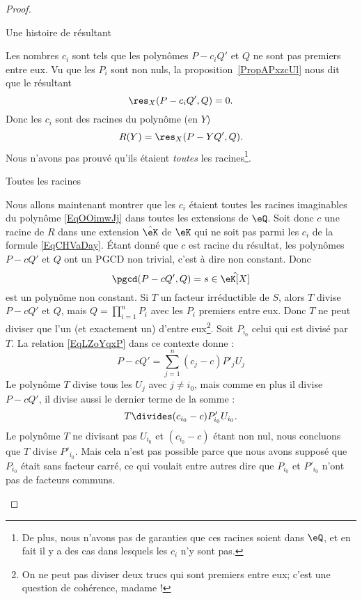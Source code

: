 \begin{proof}
\begin{subproof}
\item[Une histoire de résultant]

    Les nombres \( c_i\) sont tels que les polynômes \( P-c_iQ'\) et \( Q\) ne sont pas premiers entre eux. Vu que les \( P_i\) sont non nuls, la proposition~\ref{PropAPxzcUl} nous dit que le résultant
    \begin{equation}
        \res_X(P-c_iQ',Q)=0.
    \end{equation}
    Donc les \( c_i\) sont des racines du polynôme (en \( Y\))
    \begin{equation}    \label{EqOOimwJj}
        R(Y)=\res_X(P-YQ',Q).
    \end{equation}
    Nous n'avons pas prouvé qu'ils étaient \emph{toutes} les racines\footnote{De plus, nous n'avons pas de garanties que ces racines soient dans \( \eQ\), et en fait il y a des cas dans lesquels les \( c_i\) n'y sont pas.}.

\item[Toutes les racines]

    Nous allons maintenant montrer que les \( c_i\) étaient toutes les racines imaginables du polynôme \eqref{EqOOimwJj} dans toutes les extensions de \( \eQ\). Soit donc \( c\) une racine de \( R\) dans une extension \( \hat \eK\) de \( \eK\) qui ne soit pas parmi les \( c_i\) de la formule \eqref{EqCHVaDay}. Étant donné que \( c\) est racine du résultat, les polynômes \( P-cQ'\) et \( Q\) ont un PGCD non trivial, c'est à dire non constant. Donc
    \begin{equation}
        \pgcd(P-cQ',Q)=s\in \hat\eK[X]
    \end{equation}
    est un polynôme non constant. Si \( T\) un facteur irréductible de \( S\), alors \( T\) divise \( P-cQ'\) et \( Q\), mais \( Q=\prod_{i=1}^nP_i\) avec les \( P_i\) premiers entre eux. Donc \( T\) ne peut diviser que l'un (et exactement un) d'entre eux\footnote{On ne peut pas diviser deux trucs qui sont premiers entre eux; c'est une question de cohérence, madame !}. Soit \( P_{i_0}\) celui qui est divisé par \( T\). La relation \eqref{EqLZoYqxP} dans ce contexte donne :
    \begin{equation}
        P-cQ'=\sum_{j=1}^n(c_j-c)P'_jU_j
    \end{equation}
    Le polynôme \( T\) divise tous les \( U_j\) avec \( j\neq i_0\), mais comme en plus il divise \( P-cQ'\), il divise aussi le dernier terme de la somme :
    \begin{equation}
        T\divides (c_{i_0}-c)P'_{i_0}U_{i_0}.
    \end{equation}
    Le polynôme \( T\) ne divisant pas \( U_{i_0}\) et \(  (c_{i_0}-c)  \) étant non nul, nous concluons que \( T\) divise \( P'_{i_0}\). Mais cela n'est pas possible parce que nous avons supposé que \( P_{i_0}\) était sans facteur carré, ce qui voulait entre autres dire que \( P_{i_0}\) et \( P'_{i_0}\) n'ont pas de facteurs communs.

    \end{subproof}
\end{proof}

